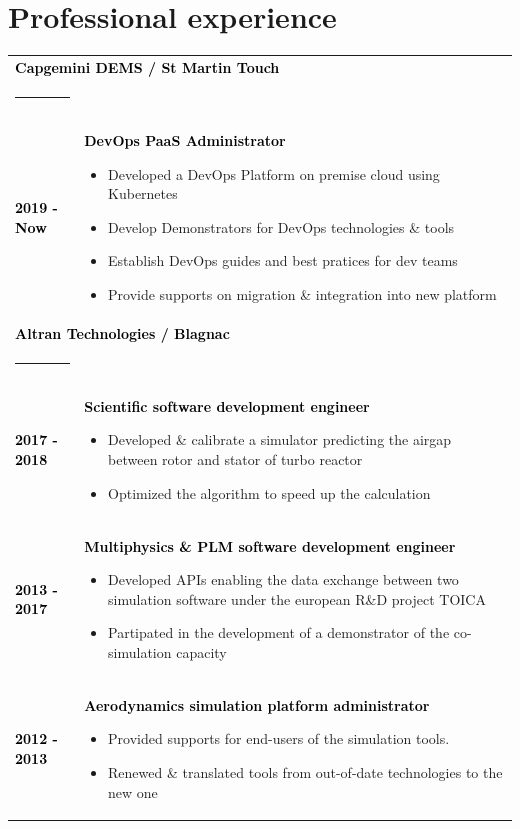 \documentclass[10pt,A4]{article}
\begin{document}
\begin{minipage}[c]{0.7\textwidth}
\section*{\hspace{0.5cm}Professional experience}
%
\begin{tabular}{p{2cm}p{11cm}}
\multicolumn{2}{l}{\textcolor{black}{\bf Capgemini DEMS / St Martin Touch}}\\
\noindent\textcolor{blue}{\rule{\textwidth}{.8mm}}\\
%
\textcolor{black}{\bf 2019 - Now} & \textcolor{black}{\bf DevOps PaaS Administrator}
\begin{itemize}
  \item \small Developed a DevOps Platform on premise cloud using Kubernetes
  \item \small Develop Demonstrators for DevOps technologies \& tools   
  \item \small Establish DevOps guides and best pratices for dev teams
  \item \small Provide supports on migration \& integration into new platform
\end{itemize}\\
%
\multicolumn{2}{l}{\textcolor{black}{\bf Altran Technologies / Blagnac}}\\
\noindent\textcolor{blue}{\rule{\textwidth}{.8mm}}\\
%
\textcolor{black}{\bf 2017 - 2018} & \textcolor{black}{\bf Scientific software development engineer}
\begin{itemize}
  \item \small Developed \& calibrate a simulator predicting the airgap between rotor and stator of turbo reactor
  \item \small Optimized the algorithm to speed up the calculation
\end{itemize}\\
%
\textcolor{black}{\bf 2013 - 2017} & \textcolor{black}{\bf Multiphysics \& PLM software development engineer}
\begin{itemize}
  \item \small Developed APIs enabling the data exchange between two simulation software under the european R\&D project TOICA
  \item \small Partipated in the development of a demonstrator of the co-simulation capacity
\end{itemize}\\
%
\textcolor{black}{\bf 2012 - 2013} & \textcolor{black}{\bf Aerodynamics simulation platform administrator}
\begin{itemize}
  \item \small Provided supports for end-users of the simulation tools.
  \item \small Renewed \& translated tools from out-of-date technologies to the new one
\end{itemize}
%
\end{tabular}
%
\vspace*{-8mm}

\end{minipage}
\end{document}
